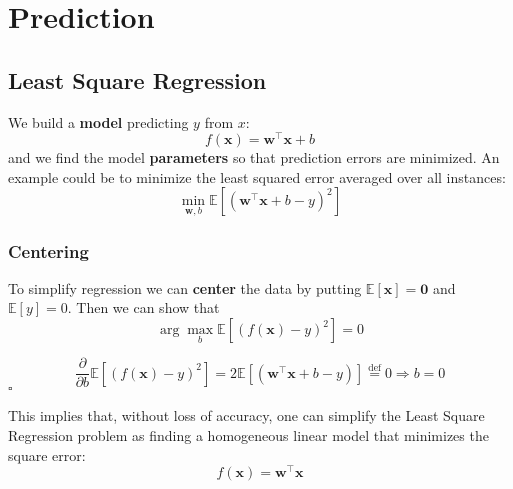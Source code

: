 \newpage
\section{Prediction}
\subsection{Least Square Regression}
We build a \textbf{model} predicting $y$ from $x$:
\begin{equation}
	f(\mathbf{x}) = \mathbf{w}^\top\mathbf{x} + b
\end{equation}
and we find the model \textbf{parameters} so that prediction errors are minimized. An example could be to minimize the least squared error averaged over all instances:
\begin{equation}
	\min_{\mathbf{w},b} \mathbb{E}[(\mathbf{w}^\top\mathbf{x}+b-y)^2]
\end{equation}
\subsubsection{Centering}
To simplify regression we can \textbf{center} the data by putting $\mathbb{E}[\mathbf{x}] = \mathbf{0}$ and $\mathbb{E}[y]=0$. Then we can show that
\begin{equation}
	\arg \max_b \mathbb{E}[(f(\mathbf{x})-y)^2] = 0
\end{equation}
\begin{demonstration}
	\begin{equation*}
		\frac{\partial}{\partial b} \mathbb{E}[(f(\mathbf{x})-y)^2] = 2\mathbb{E}[(\mathbf{w}^\top\mathbf{x}+b-y)] \overset{\text{def}}{=} 0 \Rightarrow b=0
	\end{equation*}
	\hfill$\square$
\end{demonstration}
This implies that, without loss of accuracy, one can simplify the Least Square Regression problem as finding a homogeneous linear model that minimizes the square error:
\begin{equation}
	f(\mathbf{x}) = \mathbf{w}^\top\mathbf{x}
\end{equation}
